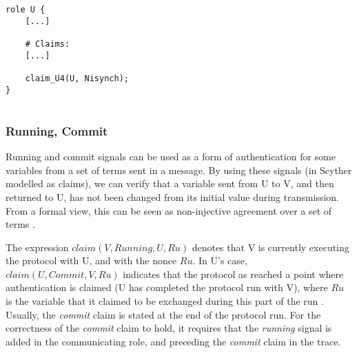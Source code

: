 \begin{lstlisting}[caption={Claim for declaring non-injective synchronization in Scyther.}, label={lst:cl-synch}]
role U {
	[...]

	# Claims:	
	[...]
	
	claim_U4(U, Nisynch);
}


\end{lstlisting}



\subsubsection{Running, Commit}

Running and commit signals can be used as a form of authentication for some variables from a set of terms sent in a message. By using these signals (in Scyther modelled as claims), we can verify that a variable sent from U to V, and then returned to U, has not been changed from its initial value during transmission. From a formal view, this can be seen as non-injective agreement over a set of terms \cite{scyther-manual}.

The expression $claim(V, Running, U, Ru)$ denotes that V is currently executing the protocol with U, and with the nonce $Ru$. In U's case, $claim(U, Commit, V, Ru)$ indicates that the protocol as reached a point where authentication is claimed (U has completed the protocol run with V), where $Ru$ is the variable that it claimed to be exchanged during this part of the run \cite{ryan2001modelling}. Usually, the \emph{commit} claim is stated at the end of the protocol run. For the correctness of the \emph{commit} claim to hold, it requires that the \emph{running} signal is added in the communicating role, and preceding the \emph{commit} claim in the trace.

